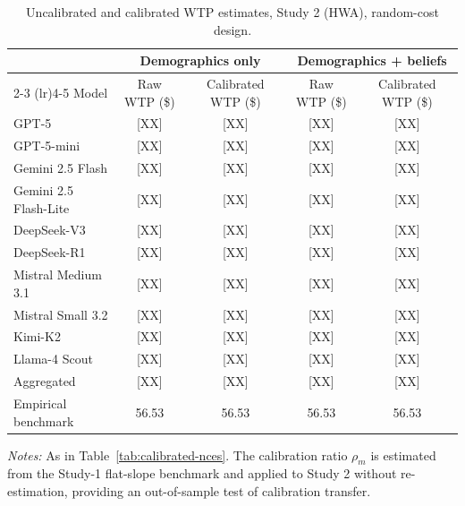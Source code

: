 \documentclass[12pt]{article}
\begin{document}
\begin{table}[h]
    \centering
    \caption{Uncalibrated and calibrated WTP estimates, Study 2 (HWA), random-cost design.}
    \label{tab:calibrated-hwa}
    \begin{threeparttable}
    \footnotesize
    \begin{tabular}{lcccc}
        \toprule
         & \multicolumn{2}{c}{Demographics only} & \multicolumn{2}{c}{Demographics + beliefs} \\
        \cmidrule(lr){2-3} \cmidrule(lr){4-5}
        Model & Raw WTP (\$) & Calibrated WTP (\$) & Raw WTP (\$) & Calibrated WTP (\$) \\
        \midrule
        GPT-5                  & [XX] & [XX] & [XX] & [XX] \\
        GPT-5-mini             & [XX] & [XX] & [XX] & [XX] \\
        Gemini 2.5 Flash       & [XX] & [XX] & [XX] & [XX] \\
        Gemini 2.5 Flash-Lite  & [XX] & [XX] & [XX] & [XX] \\
        DeepSeek-V3            & [XX] & [XX] & [XX] & [XX] \\
        DeepSeek-R1            & [XX] & [XX] & [XX] & [XX] \\
        Mistral Medium 3.1     & [XX] & [XX] & [XX] & [XX] \\
        Mistral Small 3.2      & [XX] & [XX] & [XX] & [XX] \\
        Kimi-K2                & [XX] & [XX] & [XX] & [XX] \\
        Llama-4 Scout          & [XX] & [XX] & [XX] & [XX] \\
        \midrule
        Aggregated             & [XX] & [XX] & [XX] & [XX] \\
        Empirical benchmark    & 56.53 & 56.53 & 56.53 & 56.53 \\
        \bottomrule
    \end{tabular}
    \begin{tablenotes}\footnotesize
        \item \textit{Notes:} As in Table~\ref{tab:calibrated-nces}. The calibration ratio $\rho_m$ is estimated from the Study-1 flat-slope benchmark and applied to Study 2 without re-estimation, providing an out-of-sample test of calibration transfer.
    \end{tablenotes}
    \end{threeparttable}
\end{table}
\end{document}
